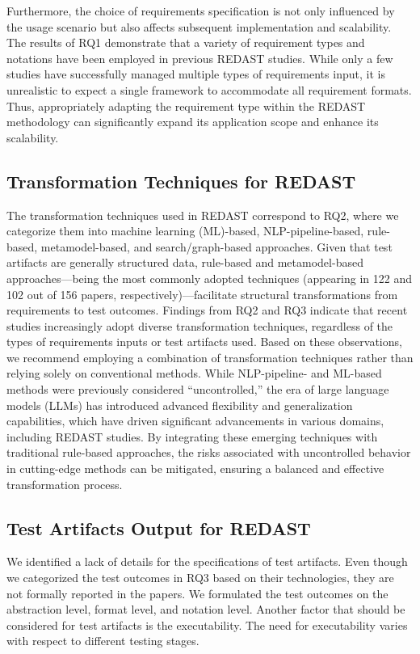 Furthermore, the choice of requirements specification is not only influenced by the usage scenario but also affects subsequent implementation and scalability. The results of RQ1 demonstrate that a variety of requirement types and notations have been employed in previous REDAST studies. While only a few studies have successfully managed multiple types of requirements input, it is unrealistic to expect a single framework to accommodate all requirement formats. Thus, appropriately adapting the requirement type within the REDAST methodology can significantly expand its application scope and enhance its scalability.

\subsection{Transformation Techniques for REDAST}

The transformation techniques used in REDAST correspond to RQ2, where we categorize them into machine learning (ML)-based, NLP-pipeline-based, rule-based, metamodel-based, and search/graph-based approaches. Given that test artifacts are generally structured data, rule-based and metamodel-based approaches—being the most commonly adopted techniques (appearing in 122 and 102 out of 156 papers, respectively)—facilitate structural transformations from requirements to test outcomes. Findings from RQ2 and RQ3 indicate that recent studies increasingly adopt diverse transformation techniques, regardless of the types of requirements inputs or test artifacts used. Based on these observations, we recommend employing a combination of transformation techniques rather than relying solely on conventional methods. While NLP-pipeline- and ML-based methods were previously considered “uncontrolled,” the era of large language models (LLMs) has introduced advanced flexibility and generalization capabilities, which have driven significant advancements in various domains, including REDAST studies. By integrating these emerging techniques with traditional rule-based approaches, the risks associated with uncontrolled behavior in cutting-edge methods can be mitigated, ensuring a balanced and effective transformation process.

\subsection{Test Artifacts Output for REDAST}
We identified a lack of details for the specifications of test artifacts. Even though we categorized the test outcomes in RQ3 based on their technologies, they are not formally reported in the papers. We formulated the test outcomes on the abstraction level, format level, and notation level. Another factor that should be considered for test artifacts is the executability. The need for executability varies with respect to different testing stages.

